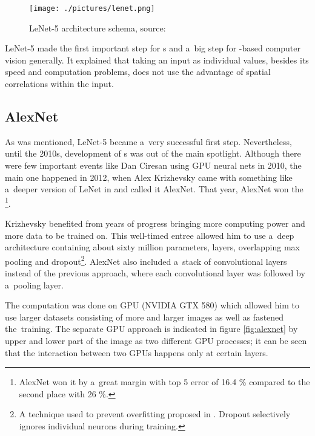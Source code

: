 \begin{figure}[h]
   \centering
	\texttt{[image: ./pictures/lenet.png]}
	\caption[LeNet-5 architecture]{LeNet-5 architecture schema, source: 
	\cite{lenet5}}
      \label{fig:lenet}
\end{figure}

LeNet-5 made the first important step for s and a~big step for 
-based computer vision generally. It explained that taking an input as 
individual values, besides its speed and computation problems, does not use 
the advantage of spatial correlations within the input. 



\subsection{AlexNet} %
\label{alexnet}

As was mentioned, LeNet-5 became a~very successful first step. Nevertheless,
until the 2010s, development of s was out of the main spotlight.
Although there were few important events like Dan Ciresan using GPU neural nets
in 2010, the main one happened in 2012, when Alex Krizhevsky came with
something like a~deeper version of LeNet in \cite{cnn-classification} and
called it AlexNet. That year, AlexNet won the \footnote{AlexNet won
it by a~great margin with top 5 error of 16.4 \% compared to the second place
with 26 \%.}.

Krizhevsky benefited from years of progress bringing more computing power and 
more data to be trained on. This well-timed entree allowed him to use a~deep 
architecture containing about sixty million parameters,  layers, 
overlapping max pooling and dropout\footnote{A technique used to prevent 
overfitting proposed in \cite{dropout}. Dropout selectively ignores individual 
neurons during training.}. AlexNet also included a~stack of convolutional
layers instead of the previous approach, where each convolutional layer was
followed by a~pooling layer. 

The computation was done on GPU (NVIDIA GTX 580) which allowed him to use
larger datasets consisting of more and larger images as well as fastened
the~training. The separate GPU approach is indicated in figure
\ref{fig:alexnet} by upper and lower part of the image as two different GPU
processes; it can be seen that the interaction between two GPUs happens only at
certain layers. 

